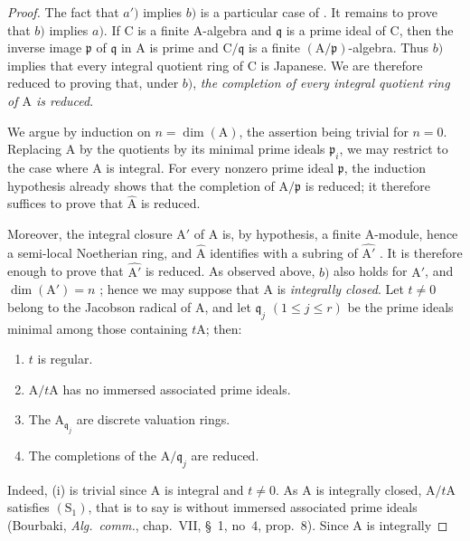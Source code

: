 \begin{proof}
The fact that $a')$ implies $b)$ is a particular case of . It remains to prove that $b)$ implies $a)$. If $\mathrm{C}$ is a finite $\mathrm{A}$-algebra and $\mathfrak{q}$ is a prime ideal of $\mathrm{C}$, then the inverse image $\mathfrak{p}$ of $\mathfrak{q}$ in $\mathrm{A}$ is prime and $\mathrm{C}/\mathfrak{q}$ is a finite $(\mathrm{A}/\mathfrak{p})$-algebra. Thus $b)$ implies that every integral quotient ring of $\mathrm{C}$ is Japanese. We are therefore reduced to proving that, under $b)$, \emph{the completion of every integral quotient ring of $\mathrm{A}$ is reduced}.

We argue by induction on $n=\dim(\mathrm{A})$, the assertion being trivial for $n=0$. Replacing $\mathrm{A}$ by the quotients by its minimal prime ideals $\mathfrak{p}_i$, we may restrict to the case where $\mathrm{A}$ is integral. For every nonzero prime ideal $\mathfrak{p}$, the induction hypothesis already shows that the completion of $\mathrm{A}/\mathfrak{p}$ is reduced; it therefore suffices to prove that $\widehat{\mathrm{A}}$ is reduced.

Moreover, the integral closure $\mathrm{A}'$ of $\mathrm{A}$ is, by hypothesis, a finite $\mathrm{A}$-module, hence a semi-local Noetherian ring, and $\widehat{\mathrm{A}}$ identifies with a subring of $\widehat{\mathrm{A}'}$ . It is therefore enough to prove that $\widehat{\mathrm{A}'}$ is reduced. As observed above, $b)$ also holds for $\mathrm{A}'$, and $\dim(\mathrm{A}')=n$ ; hence we may suppose that $\mathrm{A}$ is \emph{integrally closed}. Let $t\neq 0$ belong to the Jacobson radical of $\mathrm{A}$, and let $\mathfrak{q}_j$ $(1\leqslant j\leqslant r)$ be the prime ideals minimal among those containing $t\mathrm{A}$; then:
\begin{enumerate}[label=(\roman*)]
  \item $t$ is regular.
  \item $\mathrm{A}/t\mathrm{A}$ has no immersed associated prime ideals.
  \item The $\mathrm{A}_{\mathfrak{q}_j}$ are discrete valuation rings.
  \item The completions of the $\mathrm{A}/\mathfrak{q}_j$ are reduced.
\end{enumerate}
Indeed, (i) is trivial since $\mathrm{A}$ is integral and $t\neq 0$. As $\mathrm{A}$ is integrally closed, $\mathrm{A}/t\mathrm{A}$ satisfies $(\mathrm{S}_1)$, that is to say  is without immersed associated prime ideals (Bourbaki, \emph{Alg.\ comm.}, chap.~VII, \S~1, no~4, prop.~8). Since $\mathrm{A}$ is integrally


\end{proof}
